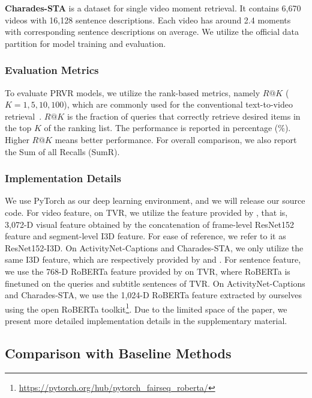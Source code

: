 \documentclass[sigconf]{acmart}
\begin{document}
 \textbf{Charades-STA} \cite{gao2017tall} is a dataset for single video moment retrieval. It contains 6,670 videos with 16,128 sentence descriptions. Each video has around 2.4 moments with corresponding sentence descriptions on average. We utilize the official data partition for model training and evaluation.



\subsubsection{Evaluation Metrics}
To evaluate PRVR models, we utilize the rank-based metrics, namely $R@K$ ($K = 1, 5, 10, 100$), which are commonly used for the conventional text-to-video retrieval~\cite{wang2020learning,dong2021dual}. 
$R@K$ is the fraction of queries that correctly retrieve desired items in the top $K$ of the ranking list. 
The performance is reported in percentage (\%).
Higher $R@K$ means better performance. For overall comparison, we also report the Sum of all Recalls (SumR).


\subsubsection{Implementation Details}
We use PyTorch as our deep learning environment, and we will release our source code.
For video feature, on TVR, we utilize the feature provided by \cite{lei2020tvr}, that is, 3,072-D  visual feature obtained by the concatenation of frame-level ResNet152 \cite{he2016deep} feature and segment-level I3D \cite{carreira2017quo} feature.
For ease of reference, we refer to it as ResNet152-I3D.
On ActivityNet-Captions and  Charades-STA, we only utilize the same I3D feature, which are respectively provided by \cite{zhang2020hierarchical} and \cite{mun2020local}.
For sentence feature, we use the 768-D RoBERTa feature provided by \cite{lei2020tvr} on TVR, where RoBERTa is finetuned on the queries and subtitle sentences of TVR.
On ActivityNet-Captions and  Charades-STA, we use the 1,024-D RoBERTa feature extracted by ourselves using the open RoBERTa toolkit\footnote{\url{https://pytorch.org/hub/pytorch_fairseq_roberta/}}.
Due to the limited space of the paper, we present more detailed implementation details in the supplementary material.



\subsection{Comparison with Baseline Methods} \label{ssec:exp-sota}
\end{document}
